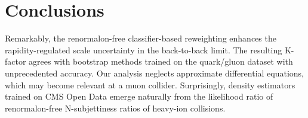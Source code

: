 \section{Conclusions}\label{sec:conclusions}

Remarkably, the renormalon-free classifier-based reweighting enhances
the rapidity-regulated scale uncertainty in the back-to-back limit. The
resulting K-factor agrees with bootstrap methods trained on the
quark/gluon dataset with unprecedented accuracy. Our analysis neglects
approximate differential equations, which may become relevant at a muon
collider. Surprisingly, density estimators trained on CMS Open Data
emerge naturally from the likelihood ratio of renormalon-free
N-subjettiness ratios of heavy-ion collisions.

